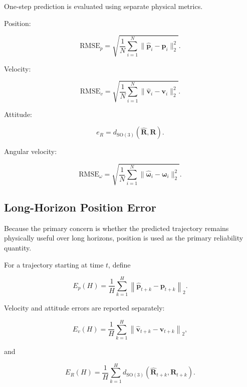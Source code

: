 \documentclass[conference]{IEEEtran}
\newcommand{\SO}{\mathrm{SO}(3)}
\begin{document}
One-step prediction is evaluated using separate physical metrics.

Position:

\begin{equation}
\mathrm{RMSE}_p
=
\sqrt{
\frac{1}{N}
\sum_{i=1}^{N}
\|
\hat{\mathbf p}_i-\mathbf p_i
\|_2^2
}.
\end{equation}

Velocity:

\begin{equation}
\mathrm{RMSE}_v
=
\sqrt{
\frac{1}{N}
\sum_{i=1}^{N}
\|
\hat{\mathbf v}_i-\mathbf v_i
\|_2^2
}.
\end{equation}

Attitude:

\begin{equation}
e_R
=
d_{\SO}
(\hat{\mathbf R},\mathbf R).
\end{equation}

Angular velocity:

\begin{equation}
\mathrm{RMSE}_{\omega}
=
\sqrt{
\frac{1}{N}
\sum_{i=1}^{N}
\|
\hat{\boldsymbol{\omega}}_i
-
\boldsymbol{\omega}_i
\|_2^2
}.
\end{equation}


\subsection{Long-Horizon Position Error}

Because the primary concern is whether the predicted trajectory remains
physically useful over long horizons, position is used as the primary
reliability quantity.

For a trajectory starting at time $t$, define

\begin{equation}
\boxed{
E_p(H)
=
\frac{1}{H}
\sum_{k=1}^{H}
\left\|
\hat{\mathbf p}_{t+k}
-
\mathbf p_{t+k}
\right\|_2.
}
\end{equation}

Velocity and attitude errors are reported separately:

\begin{equation}
E_v(H)
=
\frac{1}{H}
\sum_{k=1}^{H}
\left\|
\hat{\mathbf v}_{t+k}
-
\mathbf v_{t+k}
\right\|_2,
\end{equation}

and

\begin{equation}
E_R(H)
=
\frac{1}{H}
\sum_{k=1}^{H}
d_{\SO}
(
\hat{\mathbf R}_{t+k},
\mathbf R_{t+k}
).
\end{equation}
\end{document}
